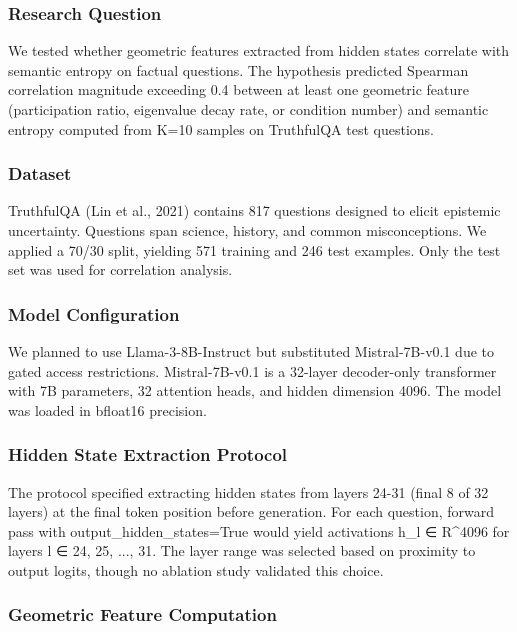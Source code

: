 
\subsubsection{Research Question}

We tested whether geometric features extracted from hidden states correlate with semantic entropy on factual questions. The hypothesis predicted Spearman correlation magnitude exceeding 0.4 between at least one geometric feature (participation ratio, eigenvalue decay rate, or condition number) and semantic entropy computed from K=10 samples on TruthfulQA test questions.

\subsubsection{Dataset}

TruthfulQA (Lin et al., 2021) contains 817 questions designed to elicit epistemic uncertainty. Questions span science, history, and common misconceptions. We applied a 70/30 split, yielding 571 training and 246 test examples. Only the test set was used for correlation analysis.

\subsubsection{Model Configuration}

We planned to use Llama-3-8B-Instruct but substituted Mistral-7B-v0.1 due to gated access restrictions. Mistral-7B-v0.1 is a 32-layer decoder-only transformer with 7B parameters, 32 attention heads, and hidden dimension 4096. The model was loaded in bfloat16 precision.

\subsubsection{Hidden State Extraction Protocol}

The protocol specified extracting hidden states from layers 24-31 (final 8 of 32 layers) at the final token position before generation. For each question, forward pass with output_hidden_states=True would yield activations h_l ∈ R^4096 for layers l ∈ {24, 25, ..., 31}. The layer range was selected based on proximity to output logits, though no ablation study validated this choice.

\subsubsection{Geometric Feature Computation}

